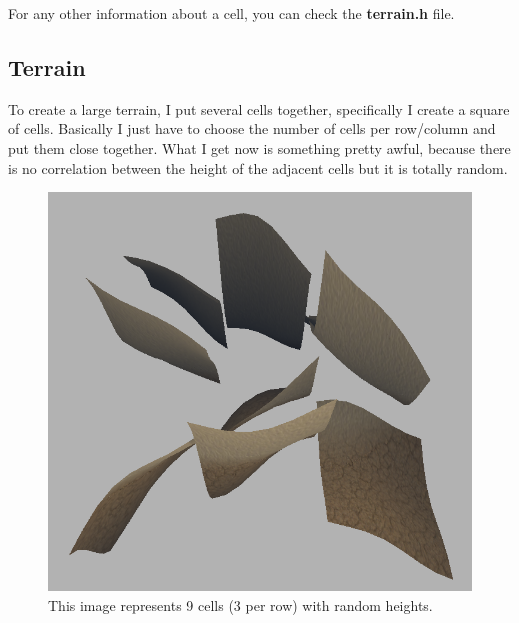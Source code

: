 \newpage
\begin{figure}[hbt!]
	\centering
	\qquad
	\caption{}
\end{figure}

\noindent
For any other information about a cell, you can check the \textbf{terrain.h} file.

\subsection{Terrain}

To create a large terrain, I put several cells together, specifically I create a square of cells. Basically I just have to choose the number of cells per row/column and put them close together. What I get now is something pretty awful, because there is no correlation between the height of the adjacent cells but it is totally random.

\smallbreak

\begin{figure}[hbt!]
	\centering
	\includegraphics[width= 0.55
	\textwidth]{images/terrain3.png}
	\caption{This image represents 9 cells (3 per row) with random heights.}
\end{figure} 

